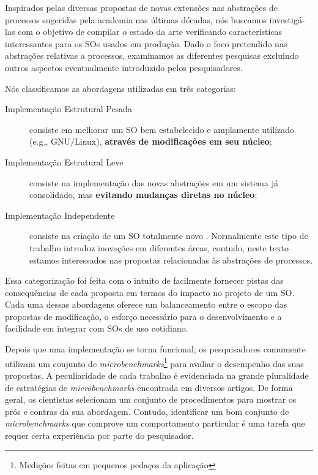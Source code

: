 Inspirados pelas diversas propostas de novas extensões nas abstrações de
processos sugeridas pela academia nas últimas décadas, nós buscamos
investigá-las com o objetivo de compilar o estado da arte verificando
características interessantes para os SOs usados em produção. Dado
o foco pretendido nas abstrações relativas a processos, examinamos
as diferentes pesquisas excluindo outros aspectos eventualmente introduzido pelos
pesquisadores.


Nós classificamos as abordagens utilizadas em três categorias:

\begin{description}
\item [Implementação Estrutural Pesada]

consiste em melhorar um SO bem estabelecido e amplamente utilizado (e.g., GNU/Linux), \textbf{através de modificações em seu núcleo};

\item [Implementação Estrutural Leve]

consiste na implementação das novas abstrações em um sistema já consolidado,
mas \textbf{evitando mudanças diretas no núcleo};

\item [Implementação Independente]

consiste na criação de um SO totalmente novo .
Normalmente este tipo de trabalho introduz inovações em diferentes áreas,
contudo, neste texto estamos interessados nas propostas relacionadas às
abstrações de processos.

\end{description}

Essa categorização foi feita com o intuito de facilmente fornecer pistas das
consequências de cada proposta em termos do impacto no projeto de um SO. Cada
uma dessas abordagens oferece um balanceamento entre o escopo das propostas de
modificação, o esforço necessário para o desenvolvimento e a facilidade em
integrar com SOs de uso cotidiano.

Depois que uma implementação se torna funcional, os pesquisadores comumente
utilizam um conjunto de \emph{microbenchmarks}\footnote{Medições feitas em
pequenos pedaços da aplicação}  para avaliar o desempenho das suas propostas. A
peculiaridade de cada trabalho é evidenciada na grande pluralidade de
estratégias de \emph{microbenchmarks} encontrada em diversos artigos.
De forma geral, os cientistas selecionam um conjunto de procedimentos para mostrar
os prós e contras da sua abordagem. Contudo, identificar um bom conjunto de
\emph{microbenchmarks} que comprove um comportamento particular é uma tarefa
que requer certa experiência por parte do pesquisador.

